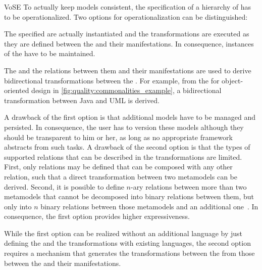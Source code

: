 \begin{copiedFrom}{VoSE}
To actually keep models consistent, the specification of a hierarchy of \conceptmetamodels has to be operationalized.
Two options for operationalization can be distinguished:

\begin{description}[leftmargin=\parindent]
    \item[\Conceptmetamodels as additional metamodels:] The specified \conceptmetamodels are actually instantiated and the transformations are executed as they are defined between the \conceptmetamodels and their manifestations. In consequence, instances of the \conceptmetamodels have to be maintained.
    \item[Transformations between \concretemetamodels:] The \conceptmetamodels and the relations between them and their manifestations are used to derive bidirectional transformations between the \concretemetamodels. For example, from the \conceptmetamodel for object-oriented design in \autoref{fig:quality:commonalities_example}, a bidirectional transformation between Java and UML is derived.
\end{description}

A drawback of the first option is that additional models have to be managed and persisted. 
In consequence, the user has to version these models although they should be transparent to him or her, as long as no appropriate framework abstracts from such tasks.
A drawback of the second option is that the types of supported relations that can be described in the transformations are limited.
First, only relations may be defined that can be composed with any other relation, such that a direct transformation between two metamodels can be derived.
Second, it is possible to define $n$-ary relations between more than two metamodels that cannot be decomposed into binary relations between them, but only into $n$ binary relations between those metamodels and an additional one~\cite{stevens2020BidirectionalTransformationLarge-SoSym}.
In consequence, the first option provides higher expressiveness.

While the first option can be realized without an additional language by just defining the \conceptmetamodels and the transformations with existing languages, the second option requires a mechanism that generates the transformations between the \concretemetamodels from those between the \conceptmetamodels and their manifestations.



\end{copiedFrom}
